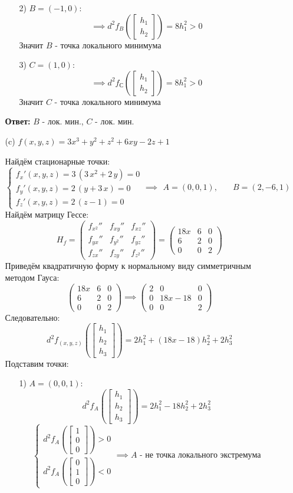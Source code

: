 \documentclass[a4paper]{article}
\newcommand{\mat}[1]{\begin{pmatrix} #1 \end{pmatrix}}
\newcommand{\matsq}[1]{\begin{bmatrix} #1 \end{bmatrix}}
\newcommand{\case}[1]{\begin{cases} #1 \end{cases}}
\begin{document}
\begin{enumerate}
\begin{enumerate}
\begin{enumerate}
            \item[2)]$B= (-1, 0)$:
            $$\implies d^2f_{B}\left(\matsq{h_1\\h_2}\right) =
             8h_1^2 > 0$$
             Значит $B$ - точка локального минимума

            \item[3)]$C = (1, 0) $:
            $$\implies d^2f_{С}\left(\matsq{h_1\\h_2}\right) =
            8h_1^2 > 0$$
            Значит $C$ - точка локального минимума
        \end{enumerate}
        \textbf{Ответ: } $B$ - лок. мин., $C$ - лок. мин.\\

        \item[(c)]$f(x, y, z) = 3x^3 + y^2 + z^2 + 6xy - 2z + 1$
        
        Найдём стационарные точки:
        $$\case{
            f_x'(x, y, z) =3\,\left(3\,{x}^{2}+2\,y\right) =0\\
            f_y'(x, y, z) = 2\,\left(y+3\,x\right)=0\\
            f_z'(x, y, z) =2\,\left(z-1\right) =0
        }\implies \begin{aligned}
            A = (0, 0, 1), &\quad B= (2, -6, 1)
        \end{aligned}$$
        Найдём матрицу Гессе:
        $$H_f = \mat{
            f_{x^2}'' & f_{xy}'' & f_{xz}''\\
            f_{yx}'' & f_{y^2}'' & f_{yz}''\\
            f_{zx}'' & f_{zy}'' & f_{z^2}''
        } = \mat{
            18x & 6 & 0\\
            6 & 2 & 0\\
            0 & 0 & 2
        } $$
        Приведём квадратичную форму к нормальному виду симметричным методом Гауса:
        $$\mat{
            18x & 6 & 0\\
            6 & 2 & 0\\
            0 & 0 & 2
        } \implies \mat{
            2 & 0 & 0\\
            0 & 18x-18 & 0\\
            0 & 0 & 2
        }$$
        Следовательно:
        $$d^2f_{(x, y, z)}\left(\matsq{h_1\\h_2\\h_3}\right) = 2h_1^2+(18x-18)h_2^2+2h_3^2$$
        Подставим точки:
        \begin{enumerate}
            \item[1)]$A = (0, 0, 1)$:
            $$d^2f_{A}\left(\matsq{h_1\\h_2\\h_3}\right) 
            = 2h_1^2-18h_2^2+2h_3^2$$
            $$\case{
                d^2f_{A}\left(\matsq{1\\0\\0}\right) >0\\
                d^2f_{A}\left(\matsq{0\\1\\0}\right) < 0 
            } \implies A \text{ - не точка локального экстремума}$$


\end{enumerate}
\end{enumerate}
\end{enumerate}
\end{document}
